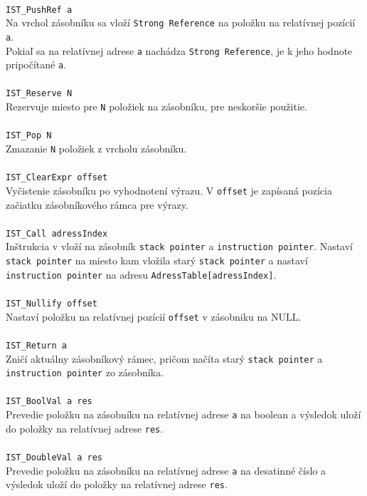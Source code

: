 \documentclass[12pt,a4paper,titlepage,final]{article}
\begin{document}
\\\texttt{IST\_PushRef a}\\
Na vrchol zásobníku sa vloží \texttt{Strong Reference} na položku na relatívnej pozícií \texttt{a}.\\
Pokiaľ sa na relatívnej adrese \texttt{a} nachádza \texttt{Strong Reference}, je k jeho hodnote pripočítané \texttt{a}.\\
\\\texttt{IST\_Reserve N}\\
Rezervuje miesto pre \texttt{N} položiek na zásobníku, pre neskoršie použitie.\\
\\\texttt{IST\_Pop N}\\
Zmazanie \texttt{N} položiek z vrcholu zásobníku.\\
\\\texttt{IST\_ClearExpr offset} \\
Vyčistenie zásobníku po vyhodnotení výrazu. V \texttt{offset} je zapísaná pozícia začiatku zásobníkového rámca pre výrazy.\\
\\\texttt{IST\_Call adressIndex}\\
Inštrukcia v vloží na zásobník \texttt{stack pointer} a \texttt{instruction pointer}. Nastaví
\texttt{stack pointer} na miesto kam vložila starý \texttt{stack pointer} a nastaví \texttt{instruction pointer} na adresu
\texttt{AdressTable[adressIndex]}.\\
\\\texttt{IST\_Nullify offset}\\
Nastaví položku na relatívnej pozícií \texttt{offset} v zásobniku na NULL.\\
\\\texttt{IST\_Return a } \\
Zničí aktuálny zásobníkový rámec, pričom načíta starý \texttt{stack pointer} a \texttt{instruction pointer} zo zásobníka.\\
\\\texttt{IST\_BoolVal a res } \\
Prevedie položku na zásobníku na relatívnej adrese \texttt{a} na boolean a výsledok uloží do položky na relatívnej adrese \texttt{res}.\\
\\\texttt{IST\_DoubleVal a res } \\
Prevedie položku na zásobníku na relatívnej adrese \texttt{a} na desatinné číslo a výsledok uloží do položky na relatívnej adrese \texttt{res}.\\
\end{document}
